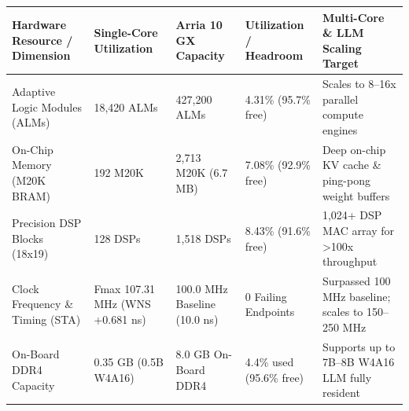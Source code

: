 \documentclass[11pt,a4paper]{article}
\begin{document}
{\footnotesize\renewcommand{\arraystretch}{1.14}\begin{longtable}{@{}L{0.21\textwidth}L{0.16\textwidth}L{0.16\textwidth}L{0.15\textwidth}L{0.22\textwidth}@{}}\toprule

\textbf{Hardware Resource /\allowbreak{} Dimension} & \textbf{Single-Core Utilization} & \textbf{Arria 10 GX Capacity} & \textbf{Utilization /\allowbreak{} Headroom} & \textbf{Multi-Core \& LLM Scaling Target}\\\midrule\endhead

Adaptive Logic Modules (\allowbreak{}ALMs)\allowbreak{} & 18,\allowbreak{}420 ALMs & 427,\allowbreak{}200 ALMs & 4.31\% (\allowbreak{}95.7\% free)\allowbreak{} & Scales to 8--16x parallel compute engines\\[2pt]

On-Chip Memory (\allowbreak{}M20K BRAM)\allowbreak{} & 192 M20K & 2,\allowbreak{}713 M20K (\allowbreak{}6.7 MB)\allowbreak{} & 7.08\% (\allowbreak{}92.9\% free)\allowbreak{} & Deep on-chip KV cache \& ping-pong weight buffers\\[2pt]

Precision DSP Blocks (\allowbreak{}18x19)\allowbreak{} & 128 DSPs & 1,\allowbreak{}518 DSPs & 8.43\% (\allowbreak{}91.6\% free)\allowbreak{} & 1,\allowbreak{}024+\allowbreak{} DSP MAC array for >100x throughput\\[2pt]

Clock Frequency \& Timing (\allowbreak{}STA)\allowbreak{} & Fmax 107.31 MHz (\allowbreak{}WNS +\allowbreak{}0.681 ns)\allowbreak{} & 100.0 MHz Baseline (\allowbreak{}10.0 ns)\allowbreak{} & 0 Failing Endpoints & Surpassed 100 MHz baseline; scales to 150--250 MHz\\[2pt]

On-Board DDR4 Capacity & 0.35 GB (\allowbreak{}0.5B W4A16)\allowbreak{} & 8.0 GB On-Board DDR4 & 4.4\% used (\allowbreak{}95.6\% free)\allowbreak{} & Supports up to 7B--8B W4A16 LLM fully resident\\[2pt]

\bottomrule\end{longtable}}
\end{document}
